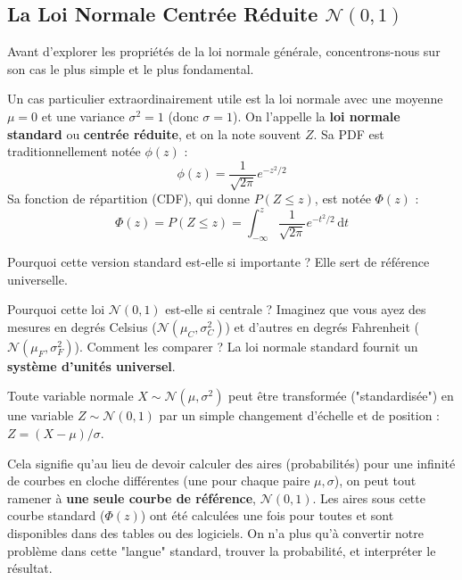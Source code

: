 \subsection{La Loi Normale Centrée Réduite $\mathcal{N}(0, 1)$}

Avant d'explorer les propriétés de la loi normale générale, concentrons-nous sur son cas le plus simple et le plus fondamental.

\begin{definitionbox}
Un cas particulier extraordinairement utile est la loi normale avec une moyenne $\mu=0$ et une variance $\sigma^2=1$ (donc $\sigma=1$). On l'appelle la \textbf{loi normale standard} ou \textbf{centrée réduite}, et on la note souvent $Z$. Sa PDF est traditionnellement notée $\phi(z)$ :
$$ \phi(z) = \frac{1}{\sqrt{2\pi}} e^{-z^2/2} $$
Sa fonction de répartition (CDF), qui donne $P(Z \le z)$, est notée $\Phi(z)$ :
$$ \Phi(z) = P(Z \le z) = \int_{-\infty}^z \frac{1}{\sqrt{2\pi}} e^{-t^2/2} \, \mathrm{d}t $$
\end{definitionbox}

Pourquoi cette version standard est-elle si importante ? Elle sert de référence universelle.

\begin{intuitionbox}
Pourquoi cette loi $\mathcal{N}(0, 1)$ est-elle si centrale ? Imaginez que vous ayez des mesures en degrés Celsius ($\mathcal{N}(\mu_C, \sigma_C^2)$) et d'autres en degrés Fahrenheit ($\mathcal{N}(\mu_F, \sigma_F^2)$). Comment les comparer ? La loi normale standard fournit un \textbf{système d'unités universel}.

Toute variable normale $X \sim \mathcal{N}(\mu, \sigma^2)$ peut être transformée ("standardisée") en une variable $Z \sim \mathcal{N}(0, 1)$ par un simple changement d'échelle et de position : $Z = (X-\mu)/\sigma$. 

Cela signifie qu'au lieu de devoir calculer des aires (probabilités) pour une infinité de courbes en cloche différentes (une pour chaque paire $\mu, \sigma$), on peut tout ramener à \textbf{une seule courbe de référence}, $\mathcal{N}(0, 1)$. Les aires sous cette courbe standard ($\Phi(z)$) ont été calculées une fois pour toutes et sont disponibles dans des tables ou des logiciels. On n'a plus qu'à convertir notre problème dans cette "langue" standard, trouver la probabilité, et interpréter le résultat.
\end{intuitionbox}

